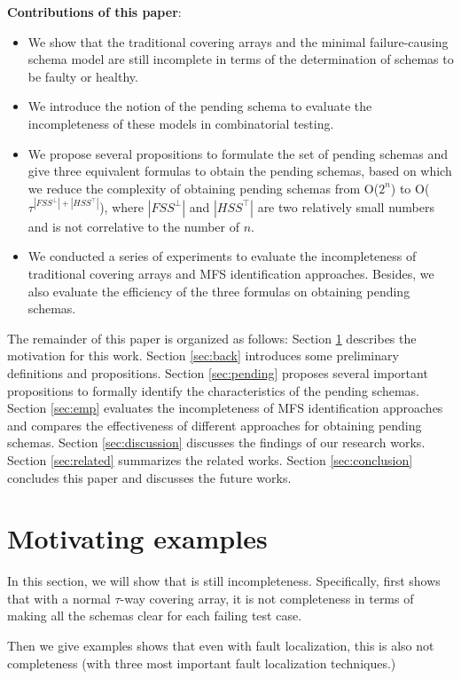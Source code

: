 \textbf{Contributions of this paper}:
\begin{itemize}

  \item We show that the traditional covering arrays and the minimal failure-causing schema model are still incomplete in terms of the determination of schemas to be faulty or healthy.
  \item We introduce the notion of the pending schema to evaluate the incompleteness of these models in combinatorial testing.
  \item We propose several propositions to formulate the set of pending schemas and give three equivalent formulas to obtain the pending schemas, based on which we reduce the complexity of obtaining pending schemas from O($2^{n}$) to O($ \tau^{|FSS^{\bot}|+|HSS^{\top}|}$), where $|FSS^{\bot}|$ and $|HSS^{\top}|$ are two relatively small numbers and is not correlative to the number of $n$.
  \item We conducted a series of experiments to evaluate the incompleteness of traditional covering arrays and MFS identification approaches. Besides, we also evaluate the efficiency of the three formulas on obtaining pending schemas.
\end{itemize}

The remainder of this paper is organized as follows: Section \ref{sec:motiv} describes the motivation for this work. Section \ref{sec:back} introduces some preliminary definitions and propositions. Section \ref{sec:pending} proposes several important propositions to formally identify the characteristics of the pending schemas. Section \ref{sec:emp} evaluates the incompleteness of MFS identification approaches and compares the effectiveness of different approaches for obtaining pending schemas. Section \ref{sec:discussion} discusses the findings of our research works.  Section \ref{sec:related} summarizes the related works. Section \ref{sec:conclusion} concludes this paper and discusses the future works.


\section{Motivating examples}\label{sec:motiv}

In this section, we will show that is still incompleteness. Specifically,
first shows that with a normal $\tau$-way covering array, it is not completeness in terms of making  all the schemas clear for each failing test case.

Then we give examples shows that even with fault localization, this is also not completeness (with three most important fault localization techniques.)

